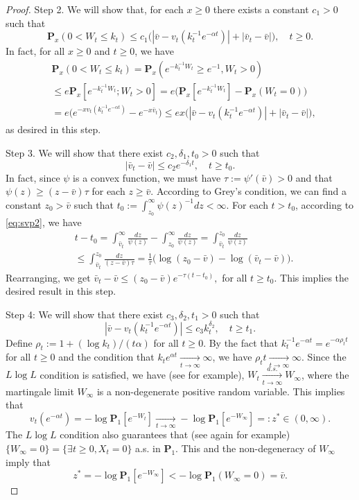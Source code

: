 \documentclass[12pt,a4paper]{amsart}
\theoremstyle{plain}
\theoremstyle{definition}
\numberwithin{equation}{section}
\begin{document}
\begin{proof}
  Step 2. We will show that, for each $x \geq 0$ there exists a constant $c_1>0$ such that
  \[
    \mathbf P_{x}(0< W_t\leq k_t)
    \leq c_1\big(|\bar v- v_t(k_t^{-1}e^{-\alpha t})|+|\bar v_t - \bar v|\big),
    \quad t\geq 0.
  \]
  In fact, for all $x\geq 0$ and $t\geq 0$, we have
  \begin{align}
    & \mathbf P_{x}(0<W_t \leq k_t)
      = \mathbf P_{x}( e^{-k_t^{-1}W_t}\geq e^{-1},W_t > 0) \\
    & \leq e \mathbf P_{x}[e^{-k_t^{-1} W_t};W_t > 0]
      =  e\big(\mathbf P_x[e^{-k_t^{-1} W_t}]-\mathbf P_x(W_t = 0)\big) \\ 
    & = e\big(e^{-xv_t(k_t^{-1} e^{-\alpha t})}-e^{-x\bar v_t}\big)
      \leq ex \big(|\bar v-v_t(k_t^{-1} e^{-\alpha t})|+ |\bar v_t- \bar v|\big),
  \end{align}
  as desired in this step.
  
  Step 3. We will show that there exist $c_2, \delta_1, t_0 > 0$ such that
  \[
    |\bar v_t-\bar v|
    \leq c_2e^{-\delta_1 t}
    , \quad t\geq t_0.
  \]
  In fact, since $\psi$ is a convex function, we must have $\tau:=\psi'(\bar v)>0$ and that  $\psi(z) \geq (z-\bar v)\tau$ for each $z\geq \bar v$.
  According to Grey's condition, we can find a constant $z_0 >\bar v $ such that $t_0 := \int^\infty_{z_0}\psi(z)^{-1}dz<\infty$.
  For each $t > t_0$, according to \eqref{eq:svp2}, we have
  \begin{align}
    & t - t_0 =
      \int^\infty_{\bar v_t} \frac{dz}{\psi(z)} - \int_{z_0}^\infty \frac{dz}{\psi(z)}
      = \int_{\bar v_t}^{z_0} \frac{dz}{\psi(z)} \\ 
    & \leq \int_{\bar v_t}^{z_0} \frac{dz}{(z-\bar v)\tau}
      = \frac{1}{\tau} \big(\log (z_0-\bar v) - \log(\bar v_t-\bar v)\big).
  \end{align}
  Rearranging, we get $ \bar v_t - \bar v \leq (z_0 - \bar v)e^{-\tau(t-t_0)}, $ for all $t\geq t_0$.
  This implies the desired result in this step.
  
  Step 4: 
  We will show that there exist $c_3, \delta_2, t_1>0$ such that
  \[
    |\bar v - v_t(k_t^{-1} e^{-\alpha t})|\leq
    c_3k_t^{\delta_2}, \quad t\geq t_1.
  \]
  Define $\rho_t := 1+(\log k_t)/(t\alpha)$ for all $t\geq 0$.
  By the fact that $k_t^{-1}e^{-\alpha t} = e^{-\alpha \rho_t t}$ for  all $t\geq 0$ and the condition that $k_t e^{\alpha t} \xrightarrow[t\to \infty]{} \infty$, we have $\rho_t t \xrightarrow[t\to \infty]{} \infty $.
  Since the $L\log L$ condition is satisfied, we have (see \cite{LiuRenSong2009Llog} for example), $W_t \xrightarrow[t\to \infty]{a.s.} W_\infty$, where the martingale limit $W_\infty$ is a non-degenerate positive random variable. This implies that
\[
  v_t(e^{-\alpha t}) 
  = -\log \mathbf P_1[e^{-W_t}]\xrightarrow[t\to \infty]{} - \log \mathbf P_{1}[e^{-W_\infty}] 
  =: z^* \in (0,\infty).
\]
The $L \log L$ condition also guarantees that (see again \cite{LiuRenSong2009Llog} for example) $\{W_\infty = 0\} = \{\exists t \geq 0, X_t= 0\}$  a.s. in $\mathbf P_1$. This and the non-degeneracy of $W_\infty$ imply that
\[
  z^*
  = -\log \mathbf P_1[e^{-W_\infty}] 
  < -\log \mathbf P_1(W_\infty = 0) = \bar v.
\]


\end{proof}
\end{document}
